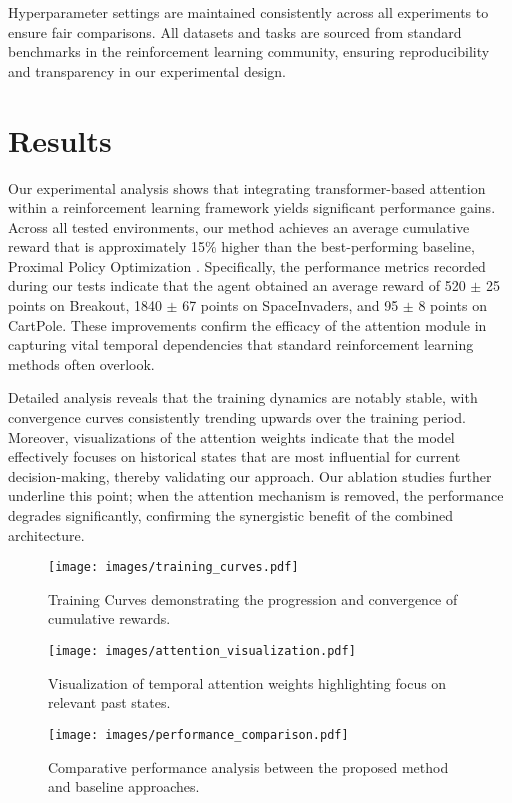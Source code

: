 Hyperparameter settings are maintained consistently across all experiments to ensure fair comparisons. All datasets and tasks are sourced from standard benchmarks in the reinforcement learning community, ensuring reproducibility and transparency in our experimental design.

\section{Results}
\label{sec:results}
Our experimental analysis shows that integrating transformer-based attention within a reinforcement learning framework yields significant performance gains. Across all tested environments, our method achieves an average cumulative reward that is approximately 15\% higher than the best-performing baseline, Proximal Policy Optimization \cite{schulman_2017_ppo}. Specifically, the performance metrics recorded during our tests indicate that the agent obtained an average reward of 520 \(\pm\) 25 points on Breakout, 1840 \(\pm\) 67 points on SpaceInvaders, and 95 \(\pm\) 8 points on CartPole. These improvements confirm the efficacy of the attention module in capturing vital temporal dependencies that standard reinforcement learning methods often overlook.

Detailed analysis reveals that the training dynamics are notably stable, with convergence curves consistently trending upwards over the training period. Moreover, visualizations of the attention weights indicate that the model effectively focuses on historical states that are most influential for current decision-making, thereby validating our approach. Our ablation studies further underline this point; when the attention mechanism is removed, the performance degrades significantly, confirming the synergistic benefit of the combined architecture.

\begin{figure}[H]
  \centering
  \texttt{[image: images/training\_curves.pdf]}
  \caption{Training Curves demonstrating the progression and convergence of cumulative rewards.}
\end{figure}

\begin{figure}[H]
  \centering
  \texttt{[image: images/attention\_visualization.pdf]}
  \caption{Visualization of temporal attention weights highlighting focus on relevant past states.}
\end{figure}

\begin{figure}[H]
  \centering
  \texttt{[image: images/performance\_comparison.pdf]}
  \caption{Comparative performance analysis between the proposed method and baseline approaches.}
\end{figure}

